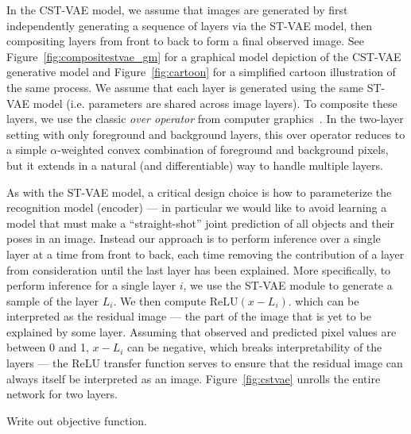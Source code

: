 In the CST-VAE model, we  assume that images are generated by first independently generating a sequence of layers 
 via the ST-VAE model, then compositing layers from front to back to form a final observed image.  See Figure~\ref{fig:compositestvae_gm} for
 a graphical model depiction of the CST-VAE generative model and Figure~\ref{fig:cartoon}
 for a simplified cartoon illustration of the same process.  We assume that each layer is generated using the same ST-VAE model
 (i.e. parameters are shared across image layers). To composite these layers,  we use  the
classic \emph{over operator} from computer graphics~\citep{porter1984compositing}.
In the two-layer setting
with only foreground and background layers, this over operator reduces to a simple $\alpha$-weighted
convex combination of foreground and background pixels, but it extends in a natural (and differentiable)
way to handle multiple layers. %


As with the ST-VAE model, a critical design choice is how to parameterize the recognition model (encoder) --- in particular we would like to 
avoid learning a model that must make a ``straight-shot'' joint prediction of all objects and their poses in an image.
Instead our approach is to perform inference over a single layer at a time from front to back, each time removing the contribution of a layer
from consideration until the last layer has been explained.
More specifically, to perform inference for a single layer $i$, we use the ST-VAE module to generate a sample of the layer $L_i$.
We then compute $\mbox{ReLU}(x-L_i)$.  which can be interpreted as the residual image --- the part of the image that is yet to be explained
by some layer.
Assuming that observed and predicted pixel values are between 0 and 1, $x-L_i$ can be negative, which breaks interpretability of the layers --- the
ReLU transfer function serves to ensure that the residual image can always itself be interpreted as an image.
Figure~\ref{fig:cstvae} unrolls the entire network for two layers.


Write out objective function.













